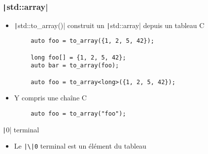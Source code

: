 \documentclass[C++.tex]{subfiles}
\begin{document}
\begin{frame}[fragile]
	\frametitle{\texttt|std::array|}
	\begin{itemize}
		\item \texttt|std::to_array()| construit un \texttt|std::array| depuis un tableau C
	\end{itemize}

	\begin{verbatim}
		auto foo = to_array({1, 2, 5, 42});

		long foo[] = {1, 2, 5, 42};
		auto bar = to_array(foo);

		auto foo = to_array<long>({1, 2, 5, 42});
	\end{verbatim}

	\begin{itemize}
		\item Y compris une chaîne C
	\end{itemize}

	\begin{verbatim}
		auto foo = to_array("foo");
	\end{verbatim}

	\begin{alertblock}{\texttt|0| terminal}
		\begin{itemize}
			\item Le \texttt{|\textbackslash|0} terminal est un élément du tableau
		\end{itemize}
	\end{alertblock}


\end{frame}
\end{document}
